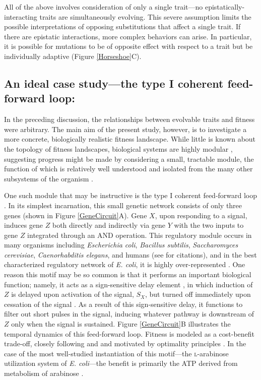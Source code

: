 \documentclass[dvips,12pt,twoside,titlepage]{article}
\begin{document}
All of the above involves consideration of only a single trait---no epistatically-interacting traits are simultaneously evolving. 
This severe assumption limits the possible interpretations of opposing substitutions that affect a single trait.
If there are epistatic interactions, more complex behaviors can arise. 
In particular, it is possible for mutations to be of opposite effect with respect to a trait but be individually adaptive (Figure \ref{Horseshoe}C). 

\subsection*{An ideal case study---the type I coherent feed-forward loop:}

In the preceding discussion, the relationships between evolvable traits and fitness were arbitrary. 
The main aim of the present study, however, is to investigate a more concrete, biologically realistic fitness landscape.
While little is known about the topology of fitness landscapes, biological systems are highly modular \cite{Hartwell:1999ef,Schlosser:2004ui,Wagner:2007hs}, suggesting progress might be made by considering a small, tractable module, the function of which is relatively well understood and isolated from the many other subsystems of the organism \cite{Alon:2006tm}. 

One such module that may be instructive is the type I coherent feed-forward loop \cite{ShenOrr:2002jo}. 
In its simplest incarnation, this small genetic network consists of only three genes (shown in Figure \ref{GeneCircuit}A). 
Gene $X$, upon responding to a signal, induces gene $Z$ both directly and indirectly via gene $Y$ with the two inputs to gene $Z$ integrated through an AND operation. 
This regulatory module occurs in many organisms including \emph{Escherichia coli}, \emph{Bacillus subtilis}, \emph{Saccharomyces cerevisiae}, \emph{Caenorhabditis elegans}, and humans (see  for citations), and in the best characterized regulatory network of \emph{E. coli}, it is highly over-represented \cite{ShenOrr:2002jo}.
One reason this motif may be so common is that it performs an important biological function; namely, it acts as a sign-sensitive delay element \cite{Mangan:2003vl}, in which induction of $Z$ is delayed upon activation of the signal, $S_X$, but turned off immediately upon cessation of the signal \cite{ShenOrr:2002jo}. As a result of this sign-sensitive delay, it functions to filter out short pulses in the signal, inducing whatever pathway is downstream of $Z$ only when the signal is sustained.
Figure \ref{GeneCircuit}B illustrates the temporal dynamics of this feed-forward loop. Fitness is modeled as a cost-benefit trade-off, closely following  and  and motivated by optimality principles \cite{Rosen:1967ut}. In the case of the most well-studied instantiation of this motif---the \textsc{l}-arabinose utilization system of \emph{E. coli}---the benefit is primarily the ATP derived from metabolism of arabinose \cite{Mangan:2003vl}.
\end{document}
